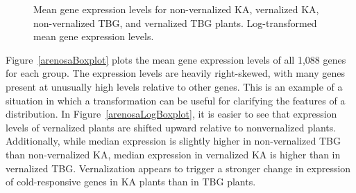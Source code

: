 \begin{figure}[h]
	\centering
	\caption{ Mean gene expression levels for non-vernalized KA, vernalized KA, non-vernalized TBG, and vernalized TBG plants.  Log-transformed mean gene expression levels.}
	\label{arenosaBoxplots}
\end{figure}

Figure~\ref{arenosaBoxplot} plots the mean gene expression levels of all 1,088 genes for each group. The expression levels are heavily right-skewed, with many genes present at unusually high levels relative to other genes. This is an example of a situation in which a transformation can be useful for clarifying the features of a distribution. In Figure~\ref{arenosaLogBoxplot}, it is easier to see that expression levels of vernalized plants are shifted upward relative to nonvernalized plants. Additionally, while median expression is slightly higher in non-vernalized TBG than non-vernalized KA, median expression in vernalized KA is higher than in vernalized TBG. Vernalization appears to trigger a stronger change in expression of cold-responsive genes in KA plants than in TBG plants.  

